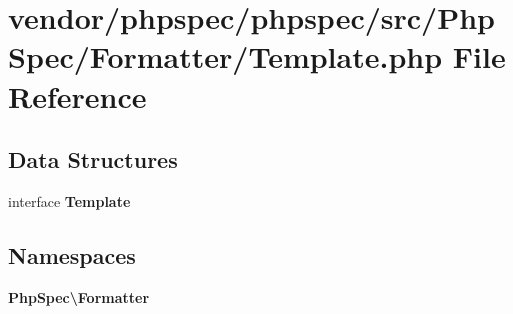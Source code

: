 \section{vendor/phpspec/phpspec/src/\+Php\+Spec/\+Formatter/\+Template.php File Reference}
\label{phpspec_2phpspec_2src_2_php_spec_2_formatter_2_template_8php}
\subsection*{Data Structures}
\begin{DoxyCompactItemize}
\item 
interface {\bf Template}
\end{DoxyCompactItemize}
\subsection*{Namespaces}
\begin{DoxyCompactItemize}
\item 
 {\bf Php\+Spec\textbackslash{}\+Formatter}
\end{DoxyCompactItemize}
